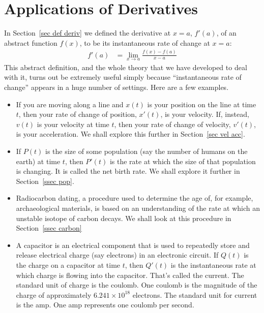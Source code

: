 %
%
\graphicspath{{figures/applications/}}

\chapter{Applications of Derivatives}\label{chap_appl_deriv}

In Section~\ref{sec def deriv} we defined the derivative at $x=a$, $f'(a)$, of an
abstract function $f(x)$, to be its instantaneous rate of change at $x=a$:
    \begin{align*}
    f'(a) &= \lim_{x\rightarrow a}\frac{f(x)-f(a)}{x-a}
    \end{align*}
This abstract definition, and the whole theory that we have developed to deal
with it, turns out be extremely useful simply because  ``instantaneous rate of
change'' appears in a huge number of settings. Here are a few examples.
\begin{itemize}
\item  If you are moving along a line and $x(t)$ is your position on the line at
time $t$, then your rate of change of position, $x'(t)$, is your velocity. If,
instead, $v(t)$ is your velocity at time $t$, then your rate of change of
velocity, $v'(t)$, is your acceleration. We shall explore this further in
Section~\ref{sec vel acc}.%


\item If $P(t)$ is the size of some population (say the number of humans on the
earth) at time $t$, then $P'(t)$ is the rate at which the size of that
population is changing. It is called the net birth rate. We shall explore it
further in Section~\ref{ssec pop}.

\item Radiocarbon dating, a procedure used to determine the age of, for example,
archaeological materials, is based on an understanding of the rate at which an unstable
isotope of carbon decays. We shall look at this procedure in Section~\ref{ssec carbon}

\item A capacitor is an electrical component that is used to repeatedly store
and release electrical charge (say electrons) in an electronic circuit. If $Q(t)$ is the
charge on a capacitor at time $t$, then $Q'(t)$ is the instantaneous rate at which charge
is flowing into the capacitor. That's called the current. The standard unit of charge is
the coulomb. One coulomb is the magnitude of the charge of approximately $6.241
\times 10^{18}$ electrons. The standard unit for current is the amp. One amp represents
one coulomb per second.
\end{itemize}


